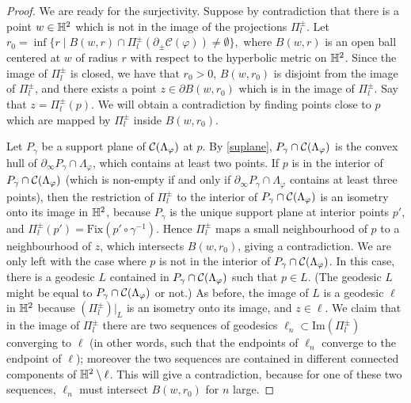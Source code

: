 \begin{proof}
    We are ready for the surjectivity. Suppose by contradiction that there is a point $w\in\mathbb{H}^2$ which is not in the image of the projections $\Pi_l^\pm$. Let $r_0=\inf\{r\;|\;B(w,r)\cap\Pi_l^\pm(\partial_\pm\mathcal{C}(\varphi))\neq\emptyset\},$ where $B(w,r)$ is an open ball centered at $w$ of radius $r$ with respect to the hyperbolic metric on $\mathbb{H}^2$. Since the image of $\Pi_l^\pm$ is closed, we have that $r_{0}>0$, $B(w,r_0)$ is disjoint from the image of $\Pi_l^\pm$, and there exists a point $z\in\partial B(w,r_0)$ which is in the image of $\Pi_l^\pm$. Say that $z=\Pi_l^\pm(p).$ We will obtain a contradiction by finding points close to $p$ which are mapped by $\Pi_l^\pm$ inside $B(w,r_0)$.

    Let $P_\gamma$ be a support plane of $\mathcal{C}(\Lambda_\varphi)$ at $p$. By \eqref{suplane}, $P_{\gamma}\cap\mathcal{C}(\Lambda_\varphi)$ is the convex hull of $\partial_\infty P_\gamma\cap\Lambda_\varphi$, which contains at least two points. If $p$ is in the interior of $P_{\gamma}\cap\mathcal{C}(\Lambda_\varphi)$ (which is non-empty if and only if $\partial_\infty P_\gamma\cap\Lambda_{\varphi}$ contains at least three points), then the restriction of $\Pi_l^\pm$ to the interior of $P_{\gamma}\cap\mathcal{C}(\Lambda_\varphi)$ is an isometry onto its image in $\mathbb{H}^2$, because $P_{\gamma}$ is the unique support plane at interior points $p'$, and  $\Pi_l^\pm(p')=\text{Fix}(p'\circ\gamma^{-1})$. Hence $\Pi_l^\pm$ maps a small neighbourhood of $p$ to a neighbourhood of $z$, which intersects $B(w,r_0)$, giving a contradiction.
    We are only left with the case where $p$ is not in the interior of $P_{\gamma}\cap\mathcal{C}(\Lambda_\varphi)$. In this case, there is a geodesic $L$ contained in $P_{\gamma}\cap\mathcal{C}(\Lambda_\varphi)$ such that $p\in L$. (The geodesic $L$ might be equal to $P_{\gamma}\cap\mathcal{C}(\Lambda_\varphi)$ or not.) As before, the image of $L$ is a geodesic $\ell$ in $\mathbb{H}^2$ because $(\Pi_l^\pm)|_L$ is an isometry onto its image, and $z\in \ell$. We claim that in the image of $\Pi_l^\pm$ there are two sequences of geodesics $\ell_n\subset\mathrm{Im}(\Pi_l^\pm)$ converging to $\ell$ (in other words, such that the endpoints of $\ell_n$ converge to the endpoint of $\ell$); moreover the two sequences are contained in different connected components of $\mathbb{H}^2\setminus\ell$. This will give a contradiction, because for one of these two sequences, $\ell_n$ must intersect $B(w,r_0)$ for $n$ large.
    

\end{proof}
